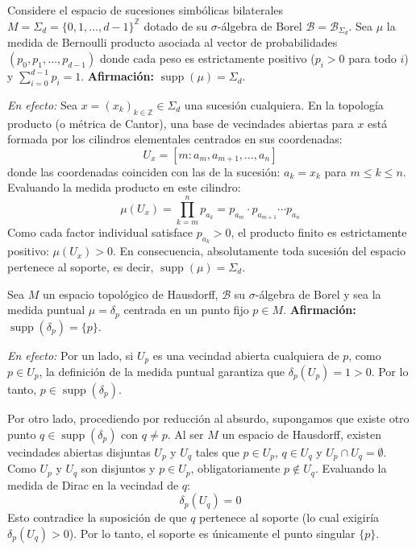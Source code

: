 \begin{ejemplo}
	Considere el espacio de sucesiones simbólicas bilaterales $M = \Sigma_d = \{0, 1, \dots, d-1\}^{\mathbb{Z}}$ dotado de su $\sigma$-álgebra de Borel $\mathcal{B} = \mathcal{B}_{\Sigma_d}$. Sea $\mu$ la medida de Bernoulli producto asociada al vector de probabilidades $(p_0, p_1, \dots, p_{d-1})$ donde cada peso es estrictamente positivo ($p_i > 0$ para todo $i$) y $\sum_{i=0}^{d-1} p_i = 1$.
	\textbf{Afirmación:} $\operatorname{supp}(\mu) = \Sigma_d$.
	
	\textit{En efecto:} Sea $x = (x_k)_{k \in \mathbb{Z}} \in \Sigma_d$ una sucesión cualquiera. En la topología producto (o métrica de Cantor), una base de vecindades abiertas para $x$ está formada por los cilindros elementales centrados en sus coordenadas:
	$$ U_x = [m : a_m, a_{m+1}, \dots, a_n] $$
	donde las coordenadas coinciden con las de la sucesión: $a_k = x_k$ para $m \le k \le n$. Evaluando la medida producto en este cilindro:
	$$ \mu(U_x) = \prod_{k=m}^n p_{a_k} = p_{a_m} \cdot p_{a_{m+1}} \cdots p_{a_n} $$
	Como cada factor individual satisface $p_{a_k} > 0$, el producto finito es estrictamente positivo: $\mu(U_x) > 0$. En consecuencia, absolutamente toda sucesión del espacio pertenece al soporte, es decir, $\operatorname{supp}(\mu) = \Sigma_d$.
\end{ejemplo}

\begin{ejemplo}
	Sea $M$ un espacio topológico de Hausdorff, $\mathcal{B}$ su $\sigma$-álgebra de Borel y sea la medida puntual $\mu = \delta_p$ centrada en un punto fijo $p \in M$.
	\textbf{Afirmación:} $\operatorname{supp}(\delta_p) = \{p\}$.
	
	\textit{En efecto:} Por un lado, si $U_p$ es una vecindad abierta cualquiera de $p$, como $p \in U_p$, la definición de la medida puntual garantiza que $\delta_p(U_p) = 1 > 0$. Por lo tanto, $p \in \operatorname{supp}(\delta_p)$.
	
	Por otro lado, procediendo por reducción al absurdo, supongamos que existe otro punto $q \in \operatorname{supp}(\delta_p)$ con $q \neq p$. Al ser $M$ un espacio de Hausdorff, existen vecindades abiertas disjuntas $U_p$ y $U_q$ tales que $p \in U_p$, $q \in U_q$ y $U_p \cap U_q = \emptyset$. Como $U_p$ y $U_q$ son disjuntos y $p \in U_p$, obligatoriamente $p \notin U_q$. Evaluando la medida de Dirac en la vecindad de $q$:
	$$ \delta_p(U_q) = 0 $$
	Esto contradice la suposición de que $q$ pertenece al soporte (lo cual exigiría $\delta_p(U_q) > 0$). Por lo tanto, el soporte es únicamente el punto singular $\{p\}$.
\end{ejemplo}

